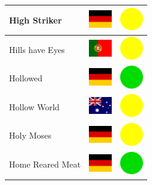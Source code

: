 \documentclass[12pt, a4paper, twoside]{report}
\begin{document}
\begin{center}
\begin{longtable}{|p{5cm}|p{2cm}|p{2cm}|}
 High Striker                                               & \includegraphics[width=1cm]{../img/flags/de} &   \includegraphics[width=1cm]{../likes/m} \\ \hline
 Hills have Eyes                                            & \includegraphics[width=1cm]{../img/flags/pt} &   \includegraphics[width=1cm]{../likes/m} \\ \hline
 Hollowed                                                   & \includegraphics[width=1cm]{../img/flags/de} &   \includegraphics[width=1cm]{../likes/y} \\ \hline
 Hollow World                                               & \includegraphics[width=1cm]{../img/flags/au} &   \includegraphics[width=1cm]{../likes/m} \\ \hline
 Holy Moses                                                 & \includegraphics[width=1cm]{../img/flags/de} &   \includegraphics[width=1cm]{../likes/m} \\ \hline
 Home Reared Meat                                           & \includegraphics[width=1cm]{../img/flags/de} &   \includegraphics[width=1cm]{../likes/y} \\ \hline

\end{longtable}
\end{center}
\end{document}
